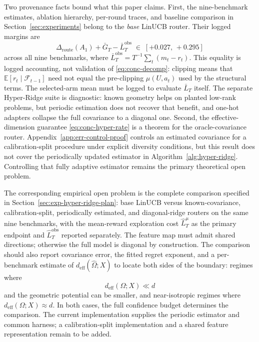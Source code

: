 \documentclass{article} %
\begin{document}
Two provenance facts bound what this paper claims. First, the nine-benchmark estimates, ablation hierarchy, per-round traces, and baseline comparison in Section~\ref{sec:experiments} belong to the \emph{base} LinUCB router. Their logged margins are
\begin{equation}
\label{eq:conc-margins}
\Delta_{\mathrm{route}}(A_1) + \bar G_T - \bar L_T^{\mathrm{obs}}
\;\in\; [+0.027,\, +0.295]
\end{equation}
across all nine benchmarks, where
\(\bar L_T^{\mathrm{obs}}=T^{-1}\sum_t(m_t-r_t)\). This equality is logged
accounting, not validation of \eqref{eq:conc-decomp}: clipping means that
\(\mathbb E[r_t\mid\mathcal F_{t-1}]\) need not equal the pre-clipping
\(\mu(U,a_t)\) used by the structural terms. The selected-arm mean must be
logged to evaluate \(\bar L_T\) itself. The separate Hyper-Ridge suite is
diagnostic: known geometry helps on planted low-rank problems, but periodic
estimation does not recover that benefit, and one-hot adapters collapse the
full covariance to a diagonal one. Second, the effective-dimension guarantee
\eqref{eq:conc-hyper-rate} is a theorem for the oracle-covariance router.
Appendix~\ref{app:err-control-proof} controls an estimated covariance for a
calibration-split procedure under explicit diversity conditions, but this
result does not cover the periodically updated estimator in
Algorithm~\ref{alg:hyper-ridge}. Controlling that fully adaptive estimator
remains the primary theoretical open problem.

The corresponding empirical open problem is the complete comparison specified in Section~\ref{sec:exp-hyper-ridge-plan}: base LinUCB versus known-covariance, calibration-split, periodically estimated, and diagonal-ridge routers on the same nine benchmarks, with the mean-reward exploration cost $\widehat L_T^\mu$ as the primary endpoint and $\widehat L_T^{\mathrm{obs}}$ reported separately. The feature map must admit shared directions; otherwise the full model is diagonal by construction. The comparison should also report covariance error, the fitted regret exponent, and a per-benchmark estimate of $d_{\mathrm{eff}}(\widehat\Omega;X)$ to locate both sides of the boundary: regimes where
\begin{equation}
\label{eq:conc-regime}
d_{\mathrm{eff}}(\Omega;X) \ll d
\end{equation}
and the geometric potential can be smaller, and near-isotropic regimes where
$d_{\mathrm{eff}}(\Omega;X)\approx d$. In both cases, the full confidence
budget determines the comparison. The current implementation supplies the
periodic estimator and common harness; a calibration-split implementation and
a shared feature representation remain to be added.
\end{document}
